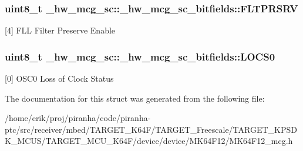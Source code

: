 \subsubsection[{\texorpdfstring{F\+L\+T\+P\+R\+S\+RV}{FLTPRSRV}}]{\setlength{\rightskip}{0pt plus 5cm}uint8\+\_\+t \+\_\+hw\+\_\+mcg\+\_\+sc\+::\+\_\+hw\+\_\+mcg\+\_\+sc\+\_\+bitfields\+::\+F\+L\+T\+P\+R\+S\+RV}\hypertarget{struct__hw__mcg__sc_1_1__hw__mcg__sc__bitfields_aaf3f335d26f466a912349524fb802e92}{}\label{struct__hw__mcg__sc_1_1__hw__mcg__sc__bitfields_aaf3f335d26f466a912349524fb802e92}
\mbox{[}4\mbox{]} F\+LL Filter Preserve Enable 
\subsubsection[{\texorpdfstring{L\+O\+C\+S0}{LOCS0}}]{\setlength{\rightskip}{0pt plus 5cm}uint8\+\_\+t \+\_\+hw\+\_\+mcg\+\_\+sc\+::\+\_\+hw\+\_\+mcg\+\_\+sc\+\_\+bitfields\+::\+L\+O\+C\+S0}\hypertarget{struct__hw__mcg__sc_1_1__hw__mcg__sc__bitfields_a6a1f0426bc9a88d864d1ff7521494537}{}\label{struct__hw__mcg__sc_1_1__hw__mcg__sc__bitfields_a6a1f0426bc9a88d864d1ff7521494537}
\mbox{[}0\mbox{]} O\+S\+C0 Loss of Clock Status 

The documentation for this struct was generated from the following file\+:\begin{DoxyCompactItemize}
\item 
/home/erik/proj/piranha/code/piranha-\/ptc/src/receiver/mbed/\+T\+A\+R\+G\+E\+T\+\_\+\+K64\+F/\+T\+A\+R\+G\+E\+T\+\_\+\+Freescale/\+T\+A\+R\+G\+E\+T\+\_\+\+K\+P\+S\+D\+K\+\_\+\+M\+C\+U\+S/\+T\+A\+R\+G\+E\+T\+\_\+\+M\+C\+U\+\_\+\+K64\+F/device/device/\+M\+K64\+F12/M\+K64\+F12\+\_\+mcg.\+h\end{DoxyCompactItemize}
